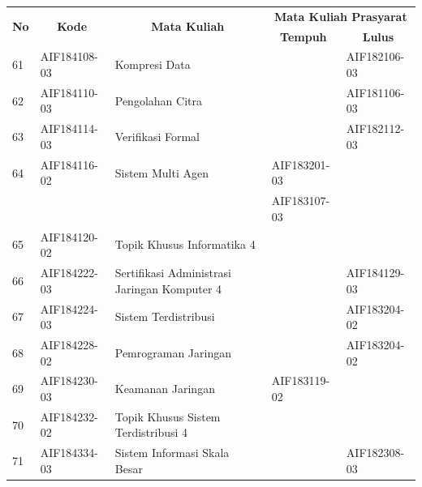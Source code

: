 \begin{table}[H]
	\centering
		\begin{tabular}{|p{0.5cm}|p{2.85cm}|p{4.95cm}|p{2.7cm}|p{2.7cm}|}
			\hline
			\multicolumn{1}{|c|}{\multirow{2}{*}{\textbf{No}}} & \multicolumn{1}{c|}{\multirow{2}{*}{\textbf{Kode}}} & \multicolumn{1}{c|}{\multirow{2}{*}{\textbf{Mata Kuliah}}} & \multicolumn{2}{c|}{\textbf{Mata Kuliah Prasyarat}} \\ \cline{4-5}
			 &  &  & \multicolumn{1}{c|}{\textbf{Tempuh}} & \multicolumn{1}{c|}{\textbf{Lulus}} \\ \hline
61 & AIF184108-03 & Kompresi Data                                                    &              & AIF182106-03       \\ \hline
62 & AIF184110-03 & Pengolahan Citra                                                 &              & AIF181106-03       \\ \hline
63 & AIF184114-03 & Verifikasi Formal                                                &              & AIF182112-03       \\ \hline
64 & AIF184116-02 & Sistem Multi Agen                                                & AIF183201-03 &                    \\
   &              &                                                                  & AIF183107-03 &                    \\ \hline
65 & AIF184120-02 & Topik Khusus Informatika 4                                       &              &                    \\ \hline
66 & AIF184222-03 & Sertifikasi Administrasi Jaringan Komputer 4                     &              & AIF184129-03       \\ \hline
67 & AIF184224-03 & Sistem Terdistribusi                                             &              & AIF183204-02       \\ \hline
68 & AIF184228-02 & Pemrograman Jaringan                                             &              & AIF183204-02       \\ \hline
69 & AIF184230-03 & Keamanan Jaringan                                                & AIF183119-02 &                    \\ \hline
70 & AIF184232-02 & Topik Khusus Sistem Terdistribusi 4                              &              &                    \\ \hline
71 & AIF184334-03 & Sistem Informasi Skala Besar                                     &              & AIF182308-03       \\ \hline

\end{tabular}
\end{table}
